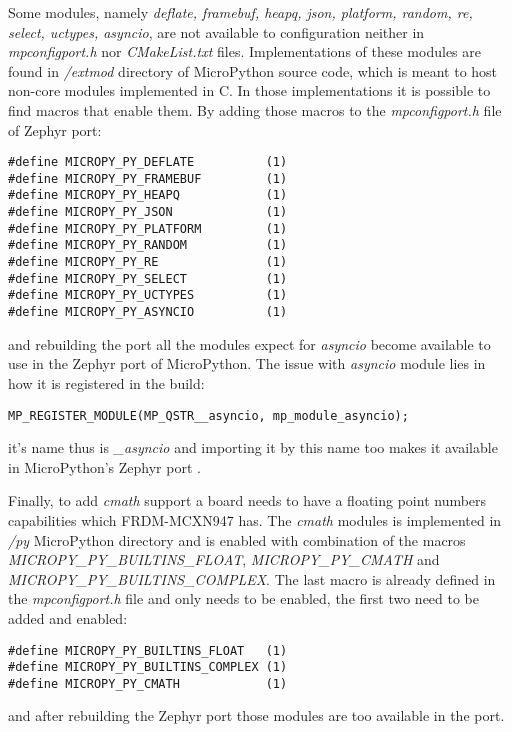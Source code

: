 \documentclass[twoside, 12pt]{article}
\begin{document}
Some modules, namely \textit{deflate, framebuf, heapq, json, platform, random, re, select, uctypes, asyncio},
are not available to configuration neither in \textit{mpconfigport.h} nor 
\textit{CMakeList.txt} files. Implementations of these modules are found in \textit{/extmod} 
directory of MicroPython source code, which is meant to host non-core modules implemented in 
C. In those implementations it is possible to find macros that enable them. By adding those 
macros to the \textit{mpconfigport.h} file of Zephyr port:
\begin{lstlisting}[caption={Extending Zephyr port modules support, Part 2},breaklines=true]
#define MICROPY_PY_DEFLATE          (1)
#define MICROPY_PY_FRAMEBUF         (1)
#define MICROPY_PY_HEAPQ            (1)
#define MICROPY_PY_JSON             (1)
#define MICROPY_PY_PLATFORM         (1)
#define MICROPY_PY_RANDOM           (1)
#define MICROPY_PY_RE               (1)
#define MICROPY_PY_SELECT           (1)
#define MICROPY_PY_UCTYPES          (1)
#define MICROPY_PY_ASYNCIO          (1)
\end{lstlisting}
and rebuilding the port all the modules expect for \textit{asyncio} become available to use 
in the Zephyr port of MicroPython. The issue with \textit{asyncio} module lies in how it is 
registered in the build:
\begin{lstlisting}[caption=Asyncio module in MicroPython's Zephyr port, breaklines=true]
MP_REGISTER_MODULE(MP_QSTR__asyncio, mp_module_asyncio);
\end{lstlisting}
it's name thus is \textit{\_asyncio} and importing it by this name too makes it available in 
MicroPython's Zephyr port .

Finally, to add \textit{cmath} support a board needs to have a floating point numbers 
capabilities \cite{mpy_cmath} which FRDM-MCXN947 has. The \textit{cmath} modules is 
implemented in \textit{/py} MicroPython directory and is enabled with combination of the 
macros \textit{MICROPY\_PY\_BUILTINS\_FLOAT}, \textit{MICROPY\_PY\_CMATH} and 
\textit{MICROPY\_PY\_BUILTINS\_COMPLEX}. The last macro is already defined in the 
\textit{mpconfigport.h} file and only needs to be enabled, the first two need to be added and 
enabled:
\begin{lstlisting}[caption={Extending Zephyr port modules support, Part 3},breaklines=true]
#define MICROPY_PY_BUILTINS_FLOAT   (1)
#define MICROPY_PY_BUILTINS_COMPLEX (1)
#define MICROPY_PY_CMATH            (1)
\end{lstlisting}
and after rebuilding the Zephyr port those modules are too available in the port.
\end{document}
